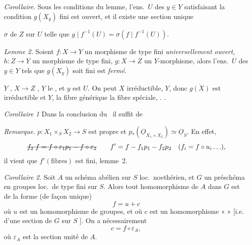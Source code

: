 \documentclass[11pt,a4paper]{article}
\begin{document}
\emph{Corollaire.} Sous les conditions du lemme, l'ens.\ $U$ des $y \in Y$ satisfaisant la condition $g(X_y)$ fini est ouvert, et il existe une section unique

$\sigma$ de $Z$ sur $U$ telle que $g \mid f^{-1}(U) = \sigma (f \mid f^{-1}(U))$.

\emph{Lemme 2.} Soient $f \colon X \to Y$ un morphisme de type fini \emph{universellement ouvert},  $h \colon Z \to Y$ un morphisme  de type fini, \struck{\ill{} \ill{} \ill{}} $g \colon X \to Z$ un $Y$-morphisme, alors l'ens.\ $U$ des $y \in Y$ tels que $g(X_y)$ soit fini est  \struck{\ill{}} \emph{fermé}.

  \ill{} \ill{} $Y$ , \struck{\ill{}} $X \to Z$ , \ill{}  \ill{} \ill{} \ill{} \ill{} \ill{} $Y$ \ill{} le  \ill{} \ill{} \ill{} \ill{} , et \ill{} \ill{} \ill{} \ill{} \ill{} $y$ est \ill{} $U$. On peut \ill{} \ill{}  $X$  irréductible,   \ill{} \ill{}  $Y$, donc $\overline{g(X)}$ est irréductible et  $Y$, \struck{\ill{}} la fibre générique \ill{} \ill{} \ill{} \ill{} la fibre spéciale, \ill{} \ill{} \ill{}. .

\emph{Corollaire 1}  Dans la conclusion du \ il suffit de \struck{\ill{} \ill{} \ill{}}  \ill{}

\emph{Remarque.}  \ill{} \ill{}  $p \colon X_1 \times_S X_2 \to S$ est propre et $p_*(\underline{O}_{X_1 \times X_2}) \simeq \underline{O}_S$. \struck{\ill{} \ill{} \ill{} \ill{} \ill{} \ill{}} En effet, \ill{}
\[
  \text{\struck{$f_2 \; f = f \circ \varepsilon_1 p_1 - f \circ \varepsilon_2$}} \qquad f' = f - f_1 p_1 - f_2 p_2 \quad (f_i = f \circ u_i \ldots),
\]
il vient   \ill{} \ill{} que $f'(\text{fibres})$ est fini,  \ill{} \ill{} \ill{} \ill{} \ill{} \ill{} \ill{} \ill{} \ill{}  lemme~2.


\emph{Corollaire 2.} Soit  $A$ un schéma abélien sur $S$ loc.\ noethérien, et $G$ un préschéma en groupes loc.\ de type fini sur $S$. Alors \struck{\ill{}} \struck{\ill{}} tout homomorphisme  de $A$ dans $G$ est de la forme (de façon unique)
\[
  f = u + c
\]
où $u$ est un homomorphisme de groupes, et où $c$ est un homomorphisme «  » [i.e.\  d'une section de $G$ sur $S$ \ill{}]. On a nécessairement
\[
  c = f \circ \varepsilon_A ,
\]
où $\varepsilon_A$ est la section unité de $A$.
\end{document}
